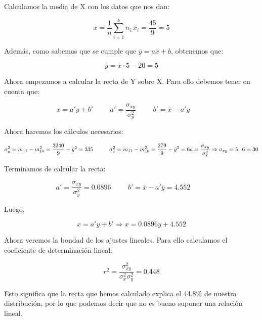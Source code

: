 \subproblem
Calculamos la media de X con los datos que nos dan:

\begin{equation*}
    \overline{x} = \dfrac{1}{n} \sum_{i=1}^k n_{i.} x_i = \dfrac{45}{9} = 5
\end{equation*}

Además, como sabemos que se cumple que $\overline{y} = a \overline{x} + b$, obtenemos que:

\begin{equation*}
    \overline{y} = \overline{x} \cdot 5 - 20 = 5
\end{equation*}

Ahora empezamos a calcular la recta de Y sobre X. Para ello debemos tener en cuenta que:

\begin{equation*}
    x = a'y + b'
    \hspace{1cm}
    a' = \dfrac{\sigma_{xy}}{\sigma_y^2}
    \hspace{1cm}
    b' = \overline{x} - a' \overline{y}
    \hspace{1cm}
\end{equation*}

Ahora haremos los cálculos necesarios:

\begin{center}
    \begin{equation*}
            \sigma_{y}^2 = m_{11} - m_{10}^2 = \dfrac{3240}{9} - \overline{y}^2 = 335
            \hspace{1cm}
            \sigma_{x}^2 = m_{11} - m_{10}^2 = \dfrac{279}{9} - \overline{y}^2 = 6\\
            
            a = \dfrac{\sigma_{xy}}{\sigma_x^2} \Rightarrow \sigma_{xy} = 5 \cdot 6 = 30
    \end{equation*}
\end{center}

Terminamos de calcular la recta:

\begin{equation*}
    a' = \dfrac{\sigma_{xy}}{\sigma_y^2} = 0.0896
    \hspace{1cm}
    b' = \overline{x} - a' \overline{y} = 4.552
    \hspace{1cm}
\end{equation*}

Luego,

\begin{equation*}
    x = a'y + b' \Rightarrow x = 0.0896y + 4.552
\end{equation*}

Ahora veremos la bondad de los ajustes lineales. Para ello calculamos el coeficiente de determinación lineal:

\begin{equation*}
    r^2 = \dfrac{\sigma_{xy}^2}{\sigma_x^2 \sigma_y^2} = 0.448
\end{equation*}

Esto significa que la recta que hemos calculado explica el 44.8\% de nuestra distribución, por lo que podemos decir que no es bueno suponer una relación lineal.
